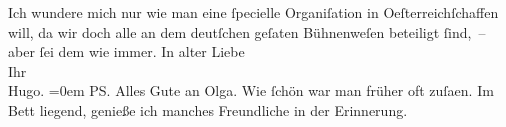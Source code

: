 \begin{ledgroupsized}[t]{13cm}
           \pstart
           Ich wundere mich nur wie man eine ſpecielle Organiſation in Oeſterreichſchaffen will, da wir doch alle an dem
                    deutſchen geſa{\geminationm}ten Bühnenweſen beteiligt ſind, –
                    aber ſei dem wie immer.\pend
           \pstart
           In alter Liebe{\\[\baselineskip]}Ihr{\\[\baselineskip]}\spacefill\mbox{Hugo.}\pend
           \leftskip=0em{}\pstart
           \noindent{}\textsc{PS}. Alles Gute an Olga. Wie ſchön war man früher oft zuſa{\geminationm}en. Im Bett liegend, genieße ich manches
                        Freundliche in der Erinnerung.\pend
                     \endnumbering{}\end{ledgroupsized}  \newcommand{\dateiname}{L02323}\newcommand{\titel}{Hugo Hofmannsthal an Arthur Schnitzler, 20. 4. 1919}\newcommand{\editorInnen}{Martin Anton Müller und Gerd-Hermann Susen}
            \footnotesize
\begin{ledgroupsized}[t]{11.5cm}
\end{ledgroupsized}
         
      